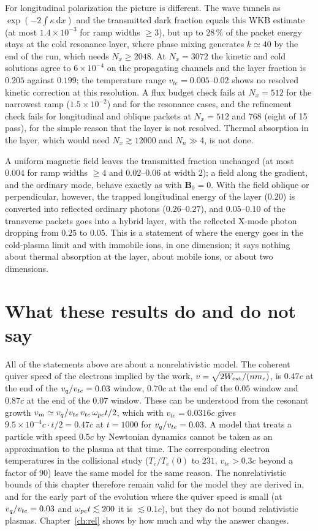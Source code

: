 For longitudinal polarization the picture is different. The wave tunnels as $\exp(-2\int\kappa\,\mathrm dx)$ and the transmitted dark fraction equals this WKB estimate (at most $1.4\times10^{-3}$ for ramp widths $\ge3$), but up to $28\,\%$ of the packet energy stays at the cold resonance layer, where phase mixing generates $k\simeq40$ by the end of the run, which needs $N_x\ge2048$. At $N_x=3072$ the kinetic and cold solutions agree to $6\times10^{-4}$ on the propagating channels and the layer fraction is $0.205$ against $0.199$; the temperature range $v_{te}=0.005$--$0.02$ shows no resolved kinetic correction at this resolution. A flux budget check fails at $N_x=512$ for the narrowest ramp ($1.5\times10^{-2}$) and for the resonance cases, and the refinement check fails for longitudinal and oblique packets at $N_x=512$ and $768$ (eight of 15 pass), for the simple reason that the layer is not resolved. Thermal absorption in the layer, which would need $N_x\gtrsim12000$ and $N_n\gg4$, is not done.

A uniform magnetic field leaves the transmitted fraction unchanged (at most $0.004$ for ramp widths $\ge4$ and $0.02$--$0.06$ at width $2$); a field along the gradient, and the ordinary mode, behave exactly as with $\mathbf B_0=0$. With the field oblique or perpendicular, however, the trapped longitudinal energy of the layer ($0.20$) is converted into reflected ordinary photons ($0.26$--$0.27$), and $0.05$--$0.10$ of the transverse packets goes into a hybrid layer, with the reflected X-mode photon dropping from $0.25$ to $0.05$. This is a statement of where the energy goes in the cold-plasma limit and with immobile ions, in one dimension; it says nothing about thermal absorption at the layer, about mobile ions, or about two dimensions.

\section{What these results do and do not say}\label{sec:c9-scope}

All of the statements above are about a nonrelativistic model. The coherent quiver speed of the electrons implied by the work, $v=\sqrt{2W_{\rm ext}/(nm_e)}$, is $0.47c$ at the end of the $v_q/v_{te}=0.03$ window, $0.70c$ at the end of the $0.05$ window and $0.87c$ at the end of the $0.07$ window. These can be understood from the resonant growth $v_m\simeq v_q/v_{te}\,v_{te}\,\omega_{pe} t/2$, which with $v_{te}=0.0316c$ gives $9.5\times10^{-4}c\cdot t/2=0.47c$ at $t=1000$ for $v_q/v_{te}=0.03$. A model that treats a particle with speed $0.5c$ by Newtonian dynamics cannot be taken as an approximation to the plasma at that time. The corresponding electron temperatures in the collisional study ($T_e/T_e(0)$ to $231$, $v_{te}>0.3c$ beyond a factor of $90$) leave the same model for the same reason. The nonrelativistic bounds of this chapter therefore remain valid for the model they are derived in, and for the early part of the evolution where the quiver speed is small (at $v_q/v_{te}=0.03$ and $\omega_{pe} t\lesssim200$ it is $\lesssim0.1c$), but they do not bound relativistic plasmas. Chapter~\ref{ch:rel} shows by how much and why the answer changes.


